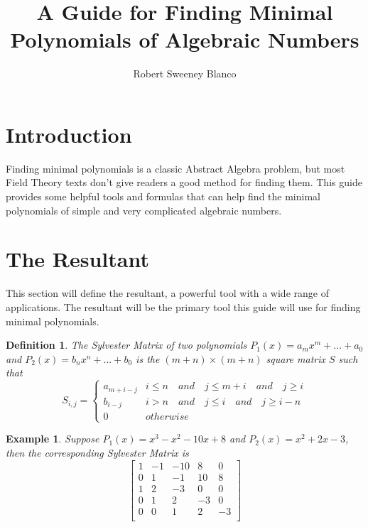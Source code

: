 \documentclass{article}
\title{A Guide for Finding Minimal Polynomials of Algebraic Numbers}
\author{Robert Sweeney Blanco}
\date{ }
\newtheorem*{Definition: Sylvester Matrix}{Definition}
\newtheorem*{Definition: Resultant 1}{Definition 1}
\newtheorem*{Definition: Resultant 2}{Definition 2}
\newtheorem*{Theorem: Resultant proves shared roots}{Theorem 1}
\newtheorem*{Theorem: Minimal polynomial for beta}{Theorem 2}
\newtheorem*{Example: Sylvester Matrix Ex}{Example}
\newtheorem*{Theorem: Roots}{Theorem}
\newtheorem*{Corollary: Discriminant}{Corollary}
\newtheorem*{Theorem: Rational Root Theorem}{Theorem}
\newtheorem*{Corollary: Cubic Irreducibility}{Corollary}
\newtheorem*{Theorem: Eisenstein Criterion}{Theorem}
\newtheorem*{Theorem: mod p Test}{Theorem}
\newtheorem*{Theorem: Rabin's algorithm}{Theorem}
\newtheorem*{Theorem: gcd finite field}{Theorem}
\newtheorem*{Theorem: Gauss Irreducibles}{Theorem}
\newtheorem*{Theorem: Number of irreducibles}{Theorem}
\newtheorem*{Example: All irreducibles in Z_2}{Example}
\newtheorem*{Formula: Minimal polynomial for r root of a}{Formula 1}
\newtheorem*{Example: minimal polynomial for sqrt(p)}{Example}
\newtheorem*{Example: Golden Ratio}{Example}
\newtheorem*{Formula: Minimal polynomial for a+b}{Formula 2}
\newtheorem*{Example: 1 + sqrt(3)}{Example}
\newtheorem*{Example: cubic root of unity}{Example}
\newtheorem*{Formula: Minimal polynomial for a/b}{Formula 3}
\newtheorem*{Formula: Minimal polynomial for ab}{Formula 4}
\newtheorem*{Example: cubrt(4)/i+1}{Example}
\newtheorem*{Example: 5zeta}{Example}
\newtheorem*{Example: Wild one}{Example}
\begin{document}
 
\maketitle
 
\tableofcontents

 
\section{Introduction}
 
Finding minimal polynomials is a classic Abstract Algebra problem, but most Field Theory texts don't give readers a good method for finding them. This guide provides some helpful tools and formulas that can help find the minimal polynomials of simple and very complicated algebraic numbers.
 
 
\section{The Resultant}
 
This section will define the resultant, a powerful tool with a wide range of applications. The resultant will be the primary tool this guide will use for finding minimal polynomials.

\begin{Definition: Sylvester Matrix}
The Sylvester Matrix of two polynomials  $P_1(x) = a_mx^m+...+a_0$ and $P_2(x) = b_nx^n +...+b_0$ is the  $(m+n) \times (m+n)$ square matrix $S$ such that 
\[ S_{i,j} = \begin{cases} 
      a_{m+i-j} & i \leq n  \quad and \quad j \leq m+i \quad and \quad j \geq i\\
      b_{i-j} & i > n  \quad and \quad j \leq i \quad and \quad j \geq i - n\\
      0 & otherwise
   \end{cases}
\]
\end{Definition: Sylvester Matrix}

\begin{Example: Sylvester Matrix Ex}
Suppose $P_1(x) = x^3-x^2-10x+8$ and $P_2(x) = x^2+2x-3$, then the corresponding Sylvester Matrix is 
\[
\begin{bmatrix}
    1 & -1 & -10 & 8 & 0 \\
    0 & 1 & -1 & 10 & 8 \\
    1 & 2 & -3 & 0 & 0 \\
    0 & 1 & 2 & -3 & 0 \\
    0 & 0 & 1 & 2 & -3 \\
\end{bmatrix}
\]
\end{Example: Sylvester Matrix Ex}
\end{document}
